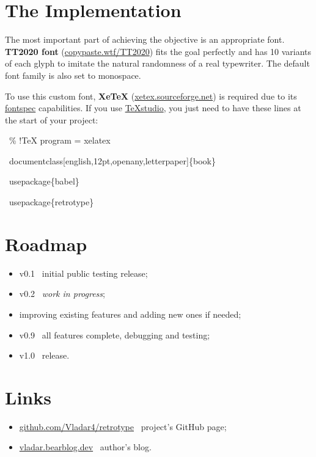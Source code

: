 \documentclass[english,12pt,openany,letterpaper]{book}
\begin{document}
\section{The Implementation}

The most important part of achieving the objective is an appropriate font. \textbf{TT2020 font} (\href{https://copypaste.wtf/TT2020/}{copypaste.wtf/TT2020}) fits the goal perfectly and has 10 variants of each glyph to imitate the natural randomness of a real typewriter. The default font family is also set to monospace.

\tab To use this custom font, \textbf{XeTeX} (\href{https://xetex.sourceforge.net/}{xetex.sourceforge.net}) is required due to its \href{https://ctan.org/pkg/fontspec}{fontspec} capabilities. If you use \href{https://www.texstudio.org/}{TeXstudio}, you just need to have these lines at the start of your project:

\begin{tabbox}[8][8]
\begin{textbox}
~\% !TeX program = xelatex

~\bs documentclass[english,12pt,openany,letterpaper]\{book\}

~\bs usepackage\{babel\}

~\bs usepackage\{retrotype\}
\end{textbox}
\end{tabbox}

\section{Roadmap}

\begin{itemize}
	\item v0.1 \dash\ initial public testing release;
	\item v0.2 \dash\ \textit{work in progress};
	\item improving existing features and adding new ones if needed;
	\item v0.9 \dash\ all features complete, debugging and testing;
	\item v1.0 \dash\ release.
\end{itemize}


\section{Links}

\begin{itemize}
	\item \href{https://github.com/Vladar4/retrotype}{github.com/Vladar4/retrotype} \dash\ project's GitHub page;
	\item \href{https://vladar.bearblog.dev}{vladar.bearblog.dev} \dash\ author's blog.
\end{itemize}
\end{document}
